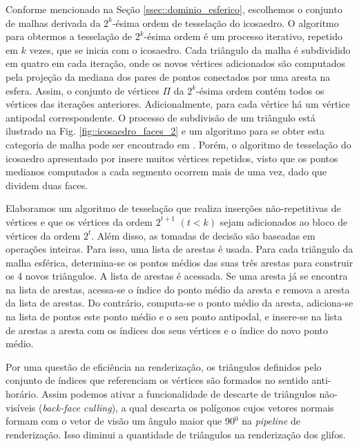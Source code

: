 
Conforme mencionado na Seção \ref{ssec::dominio_esferico}, escolhemos o conjunto de malhas derivada da $2^k$-ésima ordem de tesselação do icosaedro. O algoritmo para obtermos a tesselação de $2^k$-ésima ordem é um processo iterativo, repetido em $k$ vezes, que se inicia com o icosaedro. Cada triângulo da malha é subdividido em quatro em cada iteração, onde os novos vértices adicionados são computados pela projeção da mediana dos pares de pontos conectados por uma aresta na esfera. Assim, o conjunto de vértices $\Pi$ da $2^k$-ésima ordem contém todos os vértices das iterações anteriores. Adicionalmente, para cada vértice há um vértice antipodal correspondente. O processo de subdivisão de um triângulo está ilustrado na Fig. \ref{fig::icosaedro_faces_2} e um algoritmo para se obter esta categoria de malha pode ser encontrado em . Porém, o algoritmo de tesselação do icosaedro apresentado por  insere muitos vértices repetidos, visto que os pontos medianos computados a cada segmento ocorrem mais de uma vez, dado que dividem duas faces.


Elaboramos um algoritmo de tesselação que realiza inserções não-repetitivas de vértices e que os vértices da ordem $2^{t+1}$ $(t < k)$ sejam adicionados ao bloco de vértices da ordem $2^t$. Além disso, as tomadas de decisão são baseadas em operações inteiras. Para isso, uma lista de arestas é usada. Para cada triângulo da malha esférica, determina-se os pontos médios das suas três arestas para construir os 4 novos triângulos. A lista de arestas é acessada. Se uma aresta já se encontra na lista de arestas, acessa-se o índice do ponto médio da aresta e remova a aresta da lista de arestas. Do contrário, computa-se o ponto médio da aresta, adiciona-se na lista de pontos este ponto médio e o seu ponto antipodal, e insere-se na lista de arestas a aresta com os índices dos seus vértices e o índice do novo ponto médio.

Por uma questão de eficiência na renderização, os triângulos definidos pelo conjunto de índices que referenciam os vértices são formados no sentido anti-horário. Assim podemos ativar a funcionalidade de descarte de triângulos não-visíveis (\textit{back-face culling}), a qual descarta os polígonos cujos vetores normais formam com o vetor de visão um ângulo maior que 90$^0$ na \textit{pipeline} de renderização. Isso diminui a quantidade de triângulos na renderização dos glifos.

